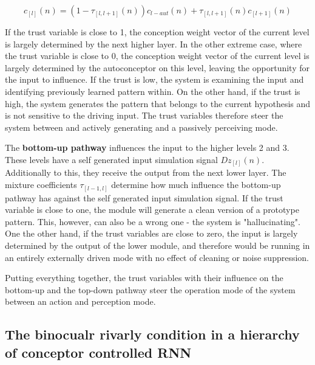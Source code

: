 \documentclass{frontiersSCNS} %
\begin{document}
    \begin{equation}
    c_{[l]}(n) = (1 - \tau_{[l,l+1]}(n)) c_{l-aut}
    (n) + \tau_{[l,l+1]}(n) c_{[l+1]}(n)
    \end{equation}
    
    If the trust variable is close to 1, the conception weight vector of the current level is largely determined by the next higher layer. In the other extreme case, where the trust variable is close to 0, the conception weight vector of the current level is largely determined by the autoconceptor on this level, leaving the opportunity for the input to influence. If the trust is low, the system is examining the input and identifying previously learned pattern within. On the other hand, if the trust is high, the system generates the pattern that belongs to the current hypothesis and is not sensitive to the driving input. The trust variables therefore steer the system between and actively generating and a passively perceiving mode. \cite{Jaeger2014} 
    
The \textbf{bottom-up pathway} influences the input to the higher levels 2 and 3. These levels have a self generated input simulation signal $D z_{[l]}(n)$. Additionally to this, they receive the output from the next lower layer. The mixture coefficients $\tau_{[l-1,l]}$ determine how much influence the bottom-up pathway has against the self generated input simulation signal. If the trust variable is close to one, the module will generate a clean version of a prototype pattern. This, however, can also be a wrong one - the system is "hallucinating". One the other hand, if the trust variables are close to zero, the input is largely determined by the output of the lower module, and therefore would be running in an entirely externally driven mode with no effect of cleaning or noise suppression.   
    
 

	Putting everything together, the trust variables with their influence on the bottom-up and the top-down pathway steer the operation mode of the system between an action and perception mode. 
    
\subsection{The binocualr rivarly condition in a hierarchy of conceptor controlled RNN}
    \label{sec:simulation}
\end{document}
